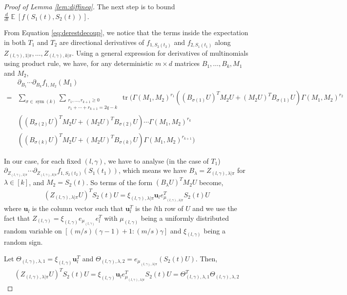 \documentclass[11pt]{amsart}
\numberwithin{equation}{section}
\numberwithin{equation}{section}
\DeclareMathOperator{\E}{\mathbb{E}}
\DeclareMathOperator*{\tr}{tr}
\DeclareMathOperator{\sym}{sym}
\theoremstyle{remark}
\theoremstyle{definition}
\begin{document}
\begin{proof}[Proof of Lemma \ref{lem:diffineq}]
The next step is to bound $\frac{d}{dt}\E[f(S_1(t),S_2(t))]$.

From Equation \eqref{eq:derestdecoup}, we notice that the terms inside the expectation in both $T_1$ and $T_2$ are directional derivatives of $f_{1,S_2(t_2)}$ and $f_{2,S_1(t_1)}$ along $Z_{(l,\gamma),1|\pi}, \ldots, Z_{(l,\gamma),k|\pi}$. Using a general expression for derivatives of multinomials using product rule, we have, for any deterministic $m \times d$ matrices $B_1, \ldots, B_k, M_1$ and $M_2$,
\begin{align*}
    &\partial_{B_1} \cdots \partial_{B_k}f_{1,M_2}(M_1)
\\=&\sum_{\sigma \in \sym (k)}\sum_{\substack{r_1,\ldots,r_{k+1}\ge 0\\
	r_1+\cdots+r_{k+1}=2q-k}}
	\tr (\Gamma(M_1,M_2)^{r_1}((B_{\sigma(1)}U)^TM_2U+(M_2U)^TB_{\sigma(1)}U)
	\Gamma(M_1,M_2)^{r_2}\\&((B_{\sigma(2)}U)^TM_2U+(M_2U)^TB_{\sigma(2)}U)\cdots
\Gamma(M_1,M_2)^{r_k}\\&((B_{\sigma(k)}U)^TM_2U+(M_2U)^TB_{\sigma(k)}U)\Gamma(M_1,M_2)^{r_{k+1}})
\end{align*}

In our case, for each fixed $(l, \gamma)$, we have to analyse (in the case of $T_1$) $\partial_{Z_{(l,\gamma),1|\pi}}\cdots\partial_{Z_{(l,\gamma),k|\pi}} \allowbreak f_{1,S_2(t_2)}(S_1(t_1))$, which means we have $B_{\lambda} = Z_{(l,\gamma),\lambda|\pi}$ for $\lambda \in [k]$, and $M_2 = S_2(t)$. So terms of the form $(B_{\lambda}U)^TM_2U$ become, 
\begin{align*}
    (Z_{(l,\gamma),\lambda|\pi}U)^TS_2(t)U
    \allowbreak =\xi_{(l,\gamma),\lambda|\pi} \mathbf{u}_l e_{\mu_{(l,\gamma),\lambda|\pi}}^TS_2(t)U
\end{align*}
where $\mathbf{u}_l$ is the column vector such that $\mathbf{u}_l^T$ is the $l$th row of $U$ and we use the fact that $Z_{(l,\gamma)}=\xi_{(l,\gamma)} e_{\mu_{(l, \gamma)}} e_l ^T$ with $\mu_{(l,\gamma)}$ being a uniformly distributed random variable on $[(m/s)(\gamma-1)+1:(m/s)\gamma]$ and $\xi_{(l,\gamma)}$ being a random sign. 

Let $\Theta_{(l,\gamma), \lambda, 1} = \xi_{(l,\gamma)}\mathbf{u}_l^T$ and $\Theta_{(l,\gamma),\lambda, 2} = e_{\mu_{(l,\gamma),\lambda|\pi}}(S_2(t)U) $. Then, 
\begin{align*}
    (Z_{(l,\gamma),\lambda|\pi}U)^TS_2(t)U
    \allowbreak =\xi_{(l,\gamma)} \mathbf{u}_l e_{\mu_{(l,\gamma),\lambda|\pi}}^TS_2(t)U = \Theta_{(l,\gamma), \lambda, 1}^T \Theta_{(l,\gamma), \lambda, 2}
\end{align*}



\end{proof}
\end{document}

